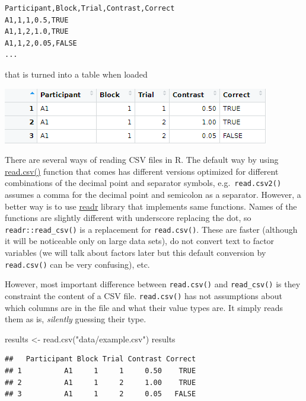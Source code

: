 \documentclass[
]{book}
\newenvironment{Shaded}{\begin{snugshade}}{\end{snugshade}}
\newcommand{\FunctionTok}[1]{\textcolor[rgb]{0.00,0.00,0.00}{#1}}
\newcommand{\NormalTok}[1]{#1}
\newcommand{\OtherTok}[1]{\textcolor[rgb]{0.56,0.35,0.01}{#1}}
\newcommand{\StringTok}[1]{\textcolor[rgb]{0.31,0.60,0.02}{#1}}
\begin{document}
\begin{verbatim}
Participant,Block,Trial,Contrast,Correct
A1,1,1,0.5,TRUE
A1,1,2,1.0,TRUE
A1,1,2,0.05,FALSE
...
\end{verbatim}

that is turned into a table when loaded

\begin{center}\includegraphics[width=0.7\linewidth]{images/results-csv-table} \end{center}

There are several ways of reading CSV files in R. The default way by using \href{https://stat.ethz.ch/R-manual/R-devel/library/utils/html/read.table.html}{read.csv()} function that comes has different versions optimized for different combinations of the decimal point and separator symbols, e.g.~\texttt{read.csv2()} assumes a comma for the decimal point and semicolon as a separator. However, a better way is to use \href{https://readr.tidyverse.org/}{readr} library that implements same functions. Names of the functions are slightly different with underscore replacing the dot, so \texttt{readr::read\_csv()} is a replacement for \texttt{read.csv()}. These are faster (although it will be noticeable only on large data sets), do not convert text to factor variables (we will talk about factors later but this default conversion by \texttt{read.csv()} can be very confusing), etc.

However, most important difference between \texttt{read.csv()} and \texttt{read\_csv()} is they constraint the content of a CSV file. \texttt{read.csv()} has not assumptions about which columns are in the file and what their value types are. It simply reads them as is, \emph{silently} guessing their type.

\begin{Shaded}
\begin{Highlighting}[]
\NormalTok{results }\OtherTok{\textless{}{-}} \FunctionTok{read.csv}\NormalTok{(}\StringTok{"data/example.csv"}\NormalTok{)}
\NormalTok{results}
\end{Highlighting}
\end{Shaded}

\begin{verbatim}
##   Participant Block Trial Contrast Correct
## 1          A1     1     1     0.50    TRUE
## 2          A1     1     2     1.00    TRUE
## 3          A1     1     2     0.05   FALSE
\end{verbatim}
\end{document}
